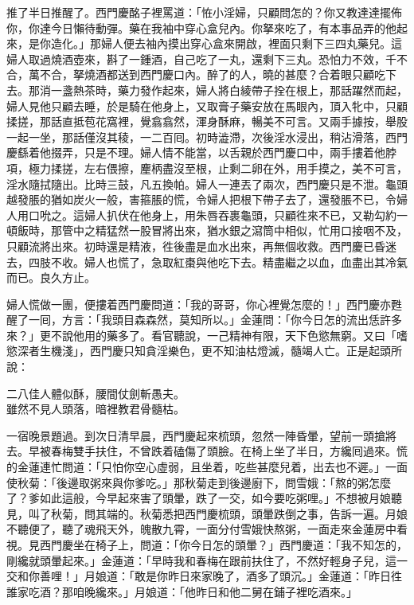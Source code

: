 推了半日推醒了。西門慶酩子裡罵道：「恠小淫婦，只顧問怎的？你又教達達擺佈你，你達今日懶待動彈。藥在我袖中穿心盒兒內。你拏來吃了，有本事品弄的他起來，是你造化。」那婦人便去袖內摸出穿心盒來開啟，裡面只剩下三四丸藥兒。這婦人取過燒酒壺來，斟了一鍾酒，自己吃了一丸，還剩下三丸。恐怕力不效，千不合，萬不合，拏燒酒都送到西門慶口內。{}醉了的人，曉的甚麼？合着眼只顧吃下去。那消一盞熱茶時，藥力發作起來，婦人將白綾帶子拴在根上，那話躍然而起，婦人見他只顧去睡，於是騎在他身上，又取膏子藥安放在馬眼內，頂入牝中，只顧揉搓，那話直抵苞花窩裡，覺翕翕然，渾身酥麻，暢美不可言。{}又兩手據按，舉股一起一坐，那話僅沒其稜，一二百囘。初時澁滯，次後淫水浸出，稍沾滑落，西門慶繇着他掇弄，只是不理。婦人情不能當，以舌親於西門慶口中，兩手摟着他脖項，極力揉搓，左右偎擦，麈柄盡沒至根，止剩二卵在外，用手摸之，美不可言，淫水隨拭隨出。比時三鼓，凡五換帕。婦人一連丟了兩次，西門慶只是不泄。龜頭越發脹的猶如炭火一般，害箍脹的慌，令婦人把根下帶子去了，還發脹不已，令婦人用口吮之。這婦人扒伏在他身上，用朱唇吞裹龜頭，只顧徃來不已，又勒勾約一頓飯時，那管中之精猛然一股冒將出來，猶水銀之瀉筒中相似，忙用口接咽不及，只顧流將出來。初時還是精液，徃後盡是血水出來，再無個收救。{}西門慶已昏迷去，四肢不收。婦人也慌了，急取紅棗與他吃下去。精盡繼之以血，血盡出其冷氣而已。{}{}良久方止。

婦人慌做一團，便摟着西門慶問道：「我的哥哥，你心裡覺怎麼的！」西門慶亦甦醒了一囘，方言：「我頭目森森然，莫知所以。」金蓮問：「你今日怎的流出恁許多來？」更不說他用的藥多了。看官聽說，一己精神有限，天下色慾無窮。又曰「嗜慾深者生機淺」，西門慶只知貪淫樂色，更不知油枯燈滅，髓竭人亡。正是起頭所說：

\begin{myquote} 
二八佳人體似酥，腰間仗劍斬愚夫。\\雖然不見人頭落，暗裡教君骨髓枯。{}
\end{myquote} 

一宿晚景題過。到次日清早晨，西門慶起來梳頭，忽然一陣昏暈，望前一頭搶將去。早被春梅雙手扶住，不曾跌着磕傷了頭臉。在椅上坐了半日，方纔囘過來。慌的金蓮連忙問道：「只怕你空心虛弱，且坐着，吃些甚麼兒着，出去也不遲。」一面使秋菊：「後邊取粥來與你爹吃。」那秋菊走到後邊廚下，問雪娥：「熬的粥怎麼了？爹如此這般，今早起來害了頭暈，跌了一交，如今要吃粥哩。」不想被月娘聽見，叫了秋菊，問其端的。秋菊悉把西門慶梳頭，頭暈跌倒之事，告訴一遍。月娘不聽便了，聽了魂飛天外，魄散九霄，一面分付雪娥快熬粥，一面走來金蓮房中看視。{}見西門慶坐在椅子上，問道：「你今日怎的頭暈？」西門慶道：「我不知怎的，剛纔就頭暈起來。」金蓮道：「早時我和春梅在跟前扶住了，{}不然好輕身子兒，這一交和你善哩！」月娘道：「敢是你昨日來家晚了，酒多了頭沉。」金蓮道：「昨日徃誰家吃酒？那咱晚纔來。」月娘道：「他昨日和他二舅在鋪子裡吃酒來。」

